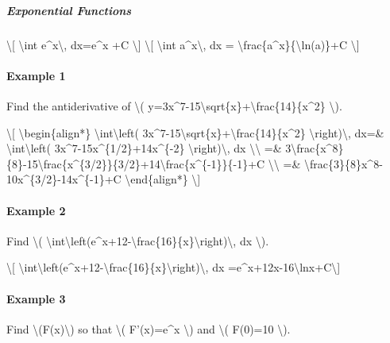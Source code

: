 \hypertarget{exponential-functions-1}{%
\subparagraph{Exponential Functions}\label{exponential-functions-1}}

\textbackslash{}{[} \textbackslash{}int e\^{}x\textbackslash{},
dx=e\^{}x +C \textbackslash{}{]} \textbackslash{}{[} \textbackslash{}int
a\^{}x\textbackslash{}, dx =
\textbackslash{}frac\{a\^{}x\}\{\textbackslash{}ln(a)\}+C
\textbackslash{}{]}

\hypertarget{example-1}{%
\paragraph{Example 1}\label{example-1}}

Find the antiderivative of \textbackslash{}(
y=3x\^{}7-15\textbackslash{}sqrt\{x\}+\textbackslash{}frac\{14\}\{x\^{}2\}
\textbackslash{}).

\textbackslash{}{[} \textbackslash{}begin\{align*\}
\textbackslash{}int\textbackslash{}left(
3x\^{}7-15\textbackslash{}sqrt\{x\}+\textbackslash{}frac\{14\}\{x\^{}2\}
\textbackslash{}right)\textbackslash{}, dx=\&
\textbackslash{}int\textbackslash{}left(
3x\^{}7-15x\^{}\{1/2\}+14x\^{}\{-2\}
\textbackslash{}right)\textbackslash{}, dx
\textbackslash{}\textbackslash{} =\&
3\textbackslash{}frac\{x\^{}8\}\{8\}-15\textbackslash{}frac\{x\^{}\{3/2\}\}\{3/2\}+14\textbackslash{}frac\{x\^{}\{-1\}\}\{-1\}+C
\textbackslash{}\textbackslash{} =\&
\textbackslash{}frac\{3\}\{8\}x\^{}8-10x\^{}\{3/2\}-14x\^{}\{-1\}+C
\textbackslash{}end\{align*\} \textbackslash{}{]}

\hypertarget{example-2}{%
\paragraph{Example 2}\label{example-2}}

Find \textbackslash{}(
\textbackslash{}int\textbackslash{}left(e\^{}x+12-\textbackslash{}frac\{16\}\{x\}\textbackslash{}right)\textbackslash{},
dx \textbackslash{}).

\textbackslash{}{[}
\textbackslash{}int\textbackslash{}left(e\^{}x+12-\textbackslash{}frac\{16\}\{x\}\textbackslash{}right)\textbackslash{},
dx
=e\^{}x+12x-16\textbackslash{}ln\textbar{}x\textbar{}+C\textbackslash{}{]}

\hypertarget{example-3}{%
\paragraph{Example 3}\label{example-3}}

Find \textbackslash{}(F(x)\textbackslash{}) so that \textbackslash{}(
F'(x)=e\^{}x \textbackslash{}) and \textbackslash{}( F(0)=10
\textbackslash{}).

